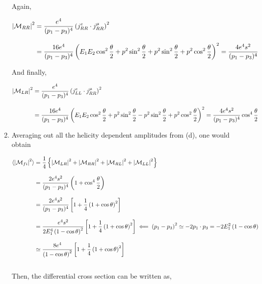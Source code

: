 \begin{solution}
\begin{enumerate}[label=(\alph*)]
        Again, 

            \begin{align*}
                \left|\mathcal{M}_{RR}\right|^2 &= \frac{e^4}{(p_1-p_3)^4} \left(j^e_{RR}\cdot j^\mu_{RR}\right)^2  \\[0.125in] 
                &= \frac{16e^4}{(p_1-p_3)^4} \left( E_1E_2\cos^2\frac{\theta}{2} + p^2 \sin^2\frac{\theta}{2} + p^2 \sin^2\frac{\theta}{2} + p^2 \cos^2\frac{\theta}{2} \right)^2 =  \frac{4e^4s^2}{(p_1-p_3)^4} 
            \end{align*}

        And finally, 

            \begin{align*}
                \left|\mathcal{M}_{LR}\right|^2 &= \frac{e^4}{(p_1-p_3)^4} \left(j^e_{LL}\cdot j^\mu_{RR}\right)^2  \\[0.125in] 
                &= \frac{16e^4}{(p_1-p_3)^4} \left( E_1E_2\cos^2\frac{\theta}{2} + p^2 \sin^2\frac{\theta}{2} - p^2 \sin^2\frac{\theta}{2} + p^2 \cos^2\frac{\theta}{2} \right)^2 = \frac{4e^4s^2}{(p_1-p_3)^4}  \cos^4\frac{\theta}{2} \\
            \end{align*}

        \item Averaging out all the helicity dependent amplitudes from (d), one would obtain 
        
            \begin{align*}
                \langle \left|\mathcal{M}_{fi}\right|^2 \rangle &= \frac{1}{4} \left\{ \left|\mathcal{M}_{LR}\right|^2 + \left|\mathcal{M}_{RR}\right|^2  + \left|\mathcal{M}_{RL}\right|^2  + \left|\mathcal{M}_{LL}\right|^2  \right\} \\[0.12in]
                &= \frac{2e^4s^2}{(p_1-p_3)^4} \left( 1+ \cos^4\frac{\theta}{2} \right) \\[0.12in]
                &= \frac{2e^4s^2}{(p_1-p_3)^4} \left[ 1+ \frac{1}{4}\left(1+\cos\theta\right)^2 \right] \\[0.12in]
                &= \frac{e^4s^2}{2E_1^4 \left( 1-\cos\theta\right)^2} \left[ 1+ \frac{1}{4}\left(1+\cos\theta\right)^2 \right] \impliedby \left(p_1-p_3\right)^2 \simeq -2p_1\cdot p_3 = -2 E_1^2 \left(1-\cos\theta \right)\\[0.12in]
                &\simeq \frac{8e^4 }{  \left( 1-\cos\theta\right)^2} \left[ 1+ \frac{1}{4}\left(1+\cos\theta\right)^2 \right]  
            \end{align*}\\
            Then, the differential cross section can be written as,


\end{enumerate}
\end{solution}
